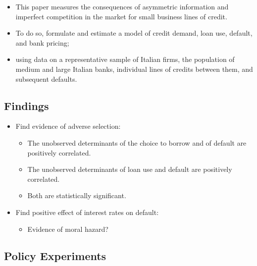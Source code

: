 \documentclass[]{book}
\providecommand{\tightlist}{%
  \setlength{\itemsep}{0pt}\setlength{\parskip}{0pt}}
\begin{document}
\begin{itemize}
\tightlist
\item
  This paper measures the consequences of asymmetric information and
  imperfect competition in the market for small business lines of
  credit.
\item
  To do so, formulate and estimate a model of credit demand, loan use,
  default, and bank pricing;
\item
  using data on a representative sample of Italian firms, the population
  of medium and large Italian banks, individual lines of credits between
  them, and subsequent defaults.
\end{itemize}

\subsection{Findings}\label{findings}

\begin{itemize}
\tightlist
\item
  Find evidence of adverse selection:

  \begin{itemize}
  \tightlist
  \item
    The unobserved determinants of the choice to borrow and of default
    are positively correlated.
  \item
    The unobserved determinants of loan use and default are positively
    correlated.
  \item
    Both are statistically significant.
  \end{itemize}
\item
  Find positive effect of interest rates on default:

  \begin{itemize}
  \tightlist
  \item
    Evidence of moral hazard?
  \end{itemize}
\end{itemize}

\subsection{Policy Experiments}\label{policy-experiments}
\end{document}
